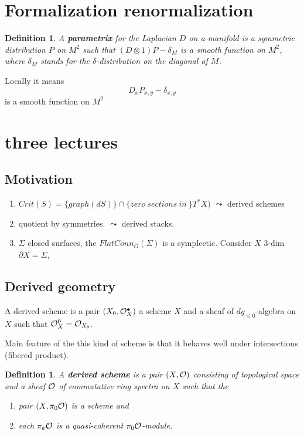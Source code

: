 \documentclass[11pt]{article}
\newtheorem{dfn}[thm]{Definition}
\newcommand{\pd}{{\partial}}
\newcommand{\calo}{{\cal O}}
\begin{document}
\section{Formalization renormalization}
\begin{dfn}
A \textbf{parametrix} for the Laplacian $D$ on a manifold is a symmetric distribution $P$ on $M^2$ such that $(D\otimes 1)P-\delta_M$ is a smooth function on $M^2$, where $\delta_M$ stands for the $\delta$-distribution on the diagonal of $M$.
\end{dfn}
Locally it means
$$
D_x P_{x,y}-\delta_{x,y}
$$
is a smooth function on $M^2$

\section{three lectures}
\subsection{Motivation}
\begin{enumerate}
\item $Crit(S)=\{graph(dS)\}\cap \{zero\ sections\ in\ \} T^*X) $ $\leadsto$ derived schemes
\item quotient by symmetries. $\leadsto$ derived stacks.
\item $\Sigma$ closed surfaces, the $FlatConn_G(\Sigma)$ is a symplectic.
Consider $X$ 3-dim $\pd X=\Sigma$,
\end{enumerate}
\subsection{
Derived geometry}
A derived scheme is a pair $(X_0,\calo_X^\bullet)$ a scheme $X$ and a sheaf of $dg_{\leq 0}$-algebra on $X$ such that $\calo^0_{X}=\calo_{X_0}$.

Main feature of the this kind of scheme is that it behaves well under intersections (fibered product).

\begin{dfn}
A \textbf{derived scheme} is a pair $(X,\calo)$ consisting of topological space and a sheaf $\calo$ of commutative ring spectra on $X$ such that the
\begin{enumerate}
\item pair $(X,\pi_0\calo)$ is a scheme and 
\item each $\pi_k\calo$ is a quasi-coherent $\pi_0\calo$-module.
\end{enumerate}
\end{dfn}
\end{document}

